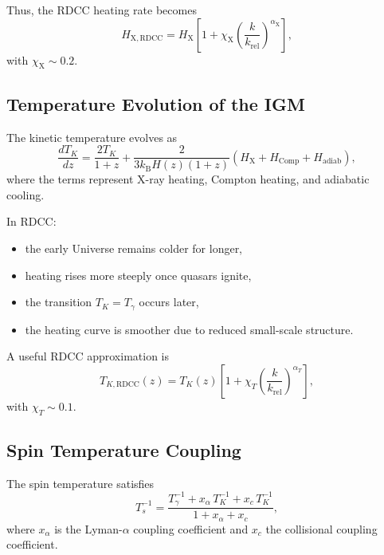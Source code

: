 \documentclass[11pt,a4paper]{article}
\begin{document}
Thus, the RDCC heating rate becomes
\begin{equation}
H_{\mathrm{X,RDCC}}
=
H_{\mathrm{X}}
\left[
1
+
\chi_{\mathrm{X}}
\left(
\frac{k}{k_{\mathrm{rel}}}
\right)^{\alpha_{\mathrm{X}}}
\right],
\end{equation}
with $\chi_{\mathrm{X}} \sim 0.2$.

\subsection{Temperature Evolution of the IGM}

The kinetic temperature evolves as
\begin{equation}
\frac{dT_{K}}{dz}
=
\frac{2T_{K}}{1+z}
+
\frac{2}{3k_{\mathrm{B}}H(z)(1+z)}
\left(
H_{\mathrm{X}}
+
H_{\mathrm{Comp}}
+
H_{\mathrm{adiab}}
\right),
\end{equation}
where the terms represent X-ray heating, Compton heating, and adiabatic cooling.

In RDCC:
\begin{itemize}
\item the early Universe remains colder for longer,
\item heating rises more steeply once quasars ignite,
\item the transition $T_{K} = T_{\gamma}$ occurs later,
\item the heating curve is smoother due to reduced small-scale structure.
\end{itemize}

A useful RDCC approximation is
\begin{equation}
T_{K,\mathrm{RDCC}}(z)
=
T_{K}(z)
\left[
1
+
\chi_{T}
\left(
\frac{k}{k_{\mathrm{rel}}}
\right)^{\alpha_{T}}
\right],
\end{equation}
with $\chi_{T} \sim 0.1$.

\subsection{Spin Temperature Coupling}

The spin temperature satisfies
\begin{equation}
T_{s}^{-1}
=
\frac{T_{\gamma}^{-1}
+
x_{\alpha}\,T_{K}^{-1}
+
x_{c}\,T_{K}^{-1}}
{1 + x_{\alpha} + x_{c}},
\end{equation}
where $x_{\alpha}$ is the Lyman-$\alpha$ coupling coefficient and $x_{c}$ the collisional coupling coefficient.
\end{document}
